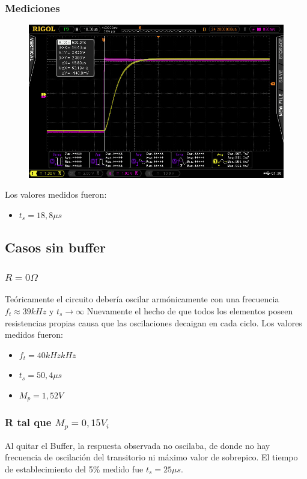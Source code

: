 \subsubsection{Mediciones}

\begin{figure}[H]
  \centering
  \includegraphics[width=\textwidth]{Mediciones_pendrive_alan/Newfile2.jpeg}  
\end{figure}

Los valores medidos fueron:
\begin{itemize}
  \item $t_s= 18,8 \mu s$
\end{itemize}

\subsection{Casos sin buffer}
\subsubsection{$R=0\Omega$}
Teóricamente el circuito debería oscilar armónicamente con una frecuencia $f_t\approx39 kHz$ y $t_s\rightarrow\infty$
Nuevamente el hecho de que todos los elementos poseen resistencias propias causa que las oscilaciones decaigan en cada ciclo. Los valores medidos fueron:
\begin{itemize}
  \item $f_t= 40 kHz kHz$
  \item $t_s=50,4\mu s$
  \item $M_p=1,52 V$
\end{itemize}

\subsubsection{R tal que $M_p=0,15V_i$}
Al quitar el Buffer, la respuesta observada no oscilaba, de donde no hay frecuencia de oscilación del transitorio ni máximo valor de sobrepico. El tiempo de establecimiento del 5\% medido fue $t_s=25\mu s$.

